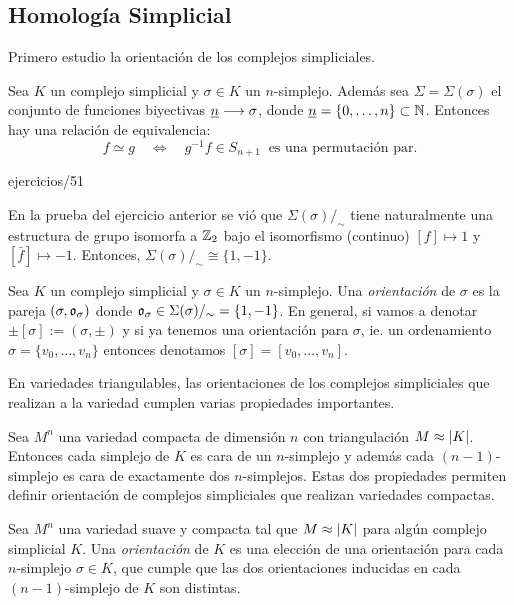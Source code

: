 \documentclass[../../topologia_algebraica]{subfiles}
\begin{document}
\subsection{Homolog\'ia Simplicial}

Primero estudio la orientaci\'on de los complejos simpliciales.

\begin{defin}
  Sea $K$ un complejo simplicial y $\sigma\in K$ un $n$-simplejo. Adem\'as sea $\Sigma=\Sigma(\sigma)$
  el conjunto de funciones biyectivas $\underline{n}\longrightarrow\sigma$, donde
  $\underline{n}=\{0,\ldots,n\}\subset\mathbb{N}$. Entonces hay una relaci\'on de equivalencia:
  \[
    f \simeq g \quad\iff\quad g^{-1}f\in S_{n+1}\;\;\text{es una permutaci\'on par.}
  \]
\end{defin}

{ejercicios/51} %

En la prueba del ejercicio anterior se vi\'o que $\Sigma(\sigma)/_{\sim}$ tiene naturalmente
una estructura de grupo isomorfa a $\mathbb{Z}_{2}$ bajo el isomorfismo (continuo) $[f]\mapsto1$ y
$[\bar{f}]\mapsto-1$. Entonces, $\Sigma(\sigma)/_{\sim}\cong\{1,-1\}$.

\begin{defin}
  Sea $K$ un complejo simplicial y $\sigma\in K$ un $n$-simplejo. Una \emph{orientaci\'on} de
  $\sigma$ es la pareja $(\sigma,\mathfrak{o}_{\sigma})$ donde $\mathfrak{o}_{\sigma}\in\Sigma(\sigma)/_{\sim}=\{1,-1\}$.
  En general, si vamos a denotar $\pm[\sigma]:=(\sigma,\pm)$ y si ya tenemos una orientaci\'on para
  $\sigma$, ie. un ordenamiento $\sigma=\{v_0,\ldots,v_n\}$ entonces denotamos $[\sigma]=[v_0,\ldots,v_n]$.
\end{defin}

En variedades triangulables, las orientaciones de los complejos simpliciales que realizan a la variedad
cumplen varias propiedades importantes.

Sea $M^n$ una variedad compacta de dimensi\'on $n$ con triangulaci\'on $M\approx\left| K \right|$. Entonces
cada simplejo de $K$ es cara de un $n$-simplejo y adem\'as cada $(n-1)$-simplejo es cara de
exactamente dos $n$-simplejos. Estas dos propiedades permiten definir orientaci\'on de complejos
simpliciales que realizan variedades compactas.

\begin{defin}
  Sea $M^n$ una variedad suave y compacta tal que $M\approx\left| K \right|$ para alg\'un complejo
  simplicial $K$. Una \emph{orientaci\'on} de $K$ es una elecci\'on de una orientaci\'on
  para cada $n$-simplejo $\sigma\in K$, que cumple que las dos orientaciones inducidas en cada
  $(n-1)$-simplejo de $K$ son distintas.
\end{defin}
\end{document}
